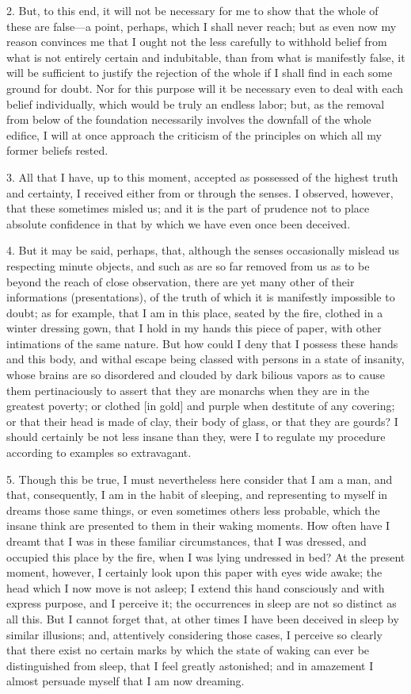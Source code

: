 2. But, to this end, it will not be necessary for me to show that the whole of these are false—a point, perhaps, which I shall never reach; but as even now my reason convinces me that I ought not the less carefully to withhold belief from what is not entirely certain and indubitable, than from what is manifestly false, it will be sufficient to justify the rejection of the whole if I shall find in each some ground for doubt. Nor for this purpose will it be necessary even to deal with each belief individually, which would be truly an endless labor; but, as the removal from below of the foundation necessarily involves the downfall of the whole edifice, I will at once approach the criticism of the principles on which all my former beliefs rested.

3. All that I have, up to this moment, accepted as possessed of the highest truth and certainty, I received either from or through the senses. I observed, however, that these sometimes misled us; and it is the part of prudence not to place absolute confidence in that by which we have even once been deceived.

4. But it may be said, perhaps, that, although the senses occasionally mislead us respecting minute objects, and such as are so far removed from us as to be beyond the reach of close observation, there are yet many other of their informations (presentations), of the truth of which it is manifestly impossible to doubt; as for example, that I am in this place, seated by the fire, clothed in a winter dressing gown, that I hold in my hands this piece of paper, with other intimations of the same nature. But how could I deny that I possess these hands and this body, and withal escape being classed with persons in a state of insanity, whose brains are so disordered and clouded by dark bilious vapors as to cause them pertinaciously to assert that they are monarchs when they are in the greatest poverty; or clothed [in gold] and purple when destitute of any covering; or that their head is made of clay, their body of glass, or that they are gourds? I should certainly be not less insane than they, were I to regulate my procedure according to examples so extravagant.

5. Though this be true, I must nevertheless here consider that I am a man, and that, consequently, I am in the habit of sleeping, and representing to myself in dreams those same things, or even sometimes others less probable, which the insane think are presented to them in their waking moments. How often have I dreamt that I was in these familiar circumstances, that I was dressed, and occupied this place by the fire, when I was lying undressed in bed? At the present moment, however, I certainly look upon this paper with eyes wide awake; the head which I now move is not asleep; I extend this hand consciously and with express purpose, and I perceive it; the occurrences in sleep are not so distinct as all this. But I cannot forget that, at other times I have been deceived in sleep by similar illusions; and, attentively considering those cases, I perceive so clearly that there exist no certain marks by which the state of waking can ever be distinguished from sleep, that I feel greatly astonished; and in amazement I almost persuade myself that I am now dreaming.

